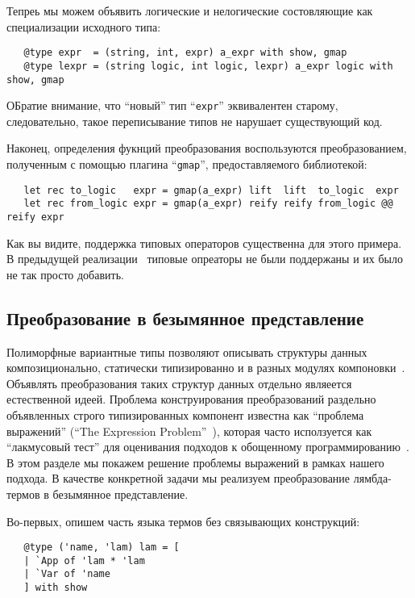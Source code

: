Тепреь мы можем объявить логические и нелогические состовляющие как специализации исходного типа:

\begin{lstlisting}
   @type expr  = (string, int, expr) a_expr with show, gmap
   @type lexpr = (string logic, int logic, lexpr) a_expr logic with show, gmap
\end{lstlisting}

ОБратие внимание, что ``новый'' тип ``\lstinline{expr}'' эквивалентен старому, следовательно, такое переписывание типов не нарушает существующий код.

Наконец, определения фукнций преобразования воспользуются преобразованием, полученным с помощью плагина ``\lstinline{gmap}'', предоставляемого библиотекой:

\begin{lstlisting}
   let rec to_logic   expr = gmap(a_expr) lift  lift  to_logic  expr
   let rec from_logic expr = gmap(a_expr) reify reify from_logic @@ reify expr
\end{lstlisting}

Как вы видите, поддержка типовых операторов существенна для этого примера. В предыдущей реализации~\cite{TransformationObjects} типовые опреаторы не были поддержаны и их было не так просто добавить.

\subsection{Преобразование в безымянное представление}

Полиморфные вариантные типы позволяют описывать структуры данных композиционально, статически типизированно и в разных модулях 
компоновки~\cite{PolyVarReuse}.
Объявлять преобразования таких структур данных отдельно являеется естественной идеей. Проблема конструирования преобразований 
раздельно объявленных строго типизированных компонент известна как ``проблема выражений'' (``The Expression Problem''~\cite{ExpressionProblem}), которая часто исползуется как ``лакмусовый тест'' для оценивания подходов к обощенному программированию~\cite{ObjectAlgebras,ALaCarte}. 
В этом разделе мы покажем решение проблемы выражений в рамках нашего подхода. В качестве конкретной задачи мы реализуем преобразование лямбда-термов в безымянное представление.

Во-первых, опишем часть языка термов без связывающих конструкций:

\begin{lstlisting}
   @type ('name, 'lam) lam = [
   | `App of 'lam * 'lam
   | `Var of 'name
   ] with show
\end{lstlisting}

